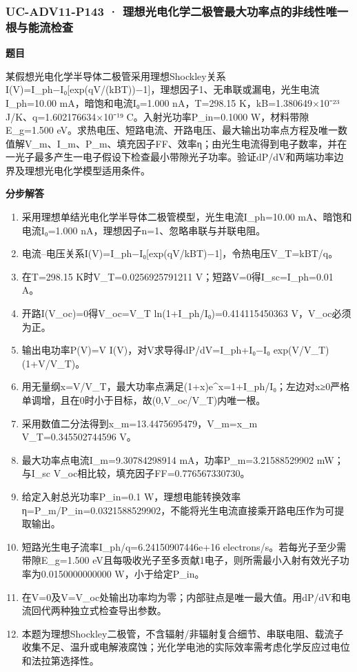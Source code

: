 \documentclass[UTF8,11pt,a4paper]{ctexart}
\begin{document}
\subsubsection*{UC-ADV11-P143 · 理想光电化学二极管最大功率点的非线性唯一根与能流检查}
\noindent\textbf{题目}\par
某假想光电化学半导体二极管采用理想Shockley关系I(V)=I\_ph−I₀[exp(qV/(kBT))−1]，理想因子1、无串联或漏电，光生电流I\_ph=10.00 mA，暗饱和电流I₀=1.000 nA，T=298.15 K，kB=1.380649×10⁻²³ J/K、q=1.602176634×10⁻¹⁹ C。入射光功率P\_in=0.1000 W，材料带隙E\_g=1.500 eV。求热电压、短路电流、开路电压、最大输出功率点方程及唯一数值解V\_m、I\_m、P\_m、填充因子FF、效率η；由光生电流得到电子数率，并在一光子最多产生一电子假设下检查最小带隙光子功率。验证dP/dV和两端功率边界及理想光电化学模型适用条件。\par
\medskip\noindent\textbf{分步解答}
\begin{enumerate}
\item 采用理想单结光电化学半导体二极管模型，光生电流I\_ph=10.00 mA、暗饱和电流I₀=1.000 nA，理想因子n=1、忽略串联与并联电阻。
\item 电流–电压关系I(V)=I\_ph−I₀[exp(qV/kBT)−1]，令热电压V\_T=kBT/q。
\item 在T=298.15 K时V\_T=0.0256925791211 V；短路V=0得I\_sc=I\_ph=0.01 A。
\item 开路I(V\_oc)=0得V\_oc=V\_T ln(1+I\_ph/I₀)=0.414115450363 V，V\_oc必须为正。
\item 输出电功率P(V)=V I(V)，对V求导得dP/dV=I\_ph+I₀−I₀ exp(V/V\_T)(1+V/V\_T)。
\item 用无量纲x=V/V\_T，最大功率点满足(1+x)e\textasciicircum{}x=1+I\_ph/I₀；左边对x≥0严格单调增，且在0时小于目标，故(0,V\_oc/V\_T)内唯一根。
\item 采用数值二分法得到x\_m=13.4475695479，V\_m=x\_m V\_T=0.345502744596 V。
\item 最大功率点电流I\_m=9.30784298914 mA，功率P\_m=3.21588529902 mW；与I\_sc V\_oc相比较，填充因子FF=0.776567330730。
\item 给定入射总光功率P\_in=0.1 W，理想电能转换效率η=P\_m/P\_in=0.0321588529902，不能将光生电流直接乘开路电压作为可提取输出。
\item 短路光生电子流率I\_ph/q=6.24150907446e+16 electrons/s。若每光子至少需带隙E\_g=1.500 eV且每吸收光子至多贡献1电子，则所需最小入射有效光子功率为0.0150000000000 W，小于给定P\_in。
\item 在V=0及V=V\_oc处输出功率均为零；内部驻点是唯一最大值。用dP/dV和电流回代两种独立式检查导出参数。
\item 本题为理想Shockley二极管，不含辐射/非辐射复合细节、串联电阻、载流子收集不足、温升或电解液腐蚀；光化学电池的实际效率需考虑化学反应过电位和法拉第选择性。
\end{enumerate}
\end{document}
